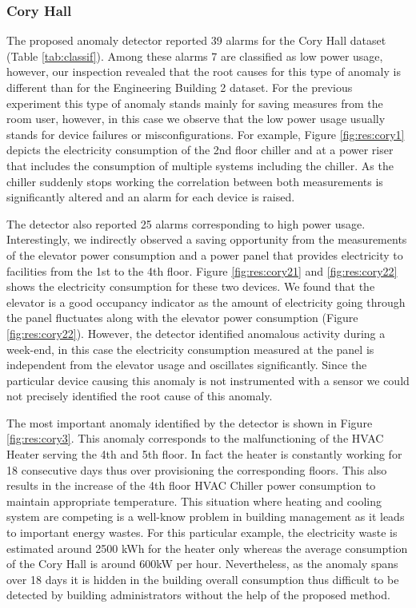 \subsubsection{Cory Hall}
The proposed anomaly detector reported 39 alarms for the Cory Hall dataset (Table \ref{tab:classif}).
Among these alarms 7 are classified as low power usage, however, our inspection revealed that the root causes for this type of anomaly is different than for the Engineering Building 2 dataset.
For the previous experiment this type of anomaly stands mainly for saving measures from the room user, however, in this case we observe that the low power usage usually stands for device failures or misconfigurations.
For example, Figure \ref{fig:res:cory1} depicts the electricity consumption of the 2nd floor chiller and at a power riser that includes the consumption of multiple systems including the chiller.
As the chiller suddenly stops working the correlation between both measurements is significantly altered and an alarm for each device is raised.

The detector also reported 25 alarms corresponding to high power usage. 
Interestingly, we indirectly observed a saving opportunity from the measurements of the elevator power consumption and a power panel that provides electricity to facilities from the 1st to the 4th floor.
Figure \ref{fig:res:cory21} and \ref{fig:res:cory22} shows the electricity consumption for these two devices. 
We found that the elevator is a good occupancy indicator as the amount of electricity going through the panel fluctuates along with the elevator power consumption (Figure \ref{fig:res:cory22}).
However, the detector identified anomalous activity during a week-end, in this case the electricity consumption measured at the panel is independent from the elevator usage and oscillates significantly.
Since the particular device causing this anomaly is not instrumented with a sensor we could not precisely identified the root cause of this anomaly.

The most important anomaly identified by the detector is shown in Figure \ref{fig:res:cory3}.
This anomaly corresponds to the malfunctioning of the HVAC Heater serving the 4th and 5th floor. 
In fact the heater is constantly working for 18 consecutive days thus over provisioning the corresponding floors.
This also results in the increase of the 4th floor HVAC Chiller power consumption to maintain appropriate temperature.
This situation where heating and cooling system are competing is a well-know problem in building management as it leads to important energy wastes.
For this particular example, the electricity waste is estimated around 2500 kWh for the heater only whereas the average consumption of the Cory Hall is around 600kW per hour.
Nevertheless, as the anomaly spans over 18 days it is hidden in the building overall consumption thus difficult to be detected by building administrators without the help of the proposed method.
